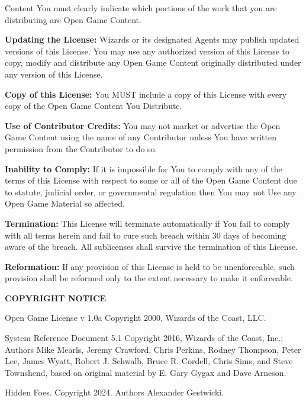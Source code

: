 \documentclass[letterpaper, 12pt, twocolumn]{article}
\def\projecttitle{Hidden Foes}
\begin{document}
\begin{footnotesize}
{Content You must clearly indicate which portions of 
the work that you are distributing are Open Game 
Content.
\item \textbf{Updating the License:} Wizards or its designated 
Agents may publish updated versions of this License. 
You may use any authorized version of this License 
to copy, modify and distribute any Open Game 
Content originally distributed under any version of 
this License.
\item \textbf{Copy of this License:} You MUST include a copy of 
this License with every copy of the Open Game 
Content You Distribute.
\item \textbf{Use of Contributor Credits:} You may not market 
or advertise the Open Game Content using the name 
of any Contributor unless You have written 
permission from the Contributor to do so.
\item \textbf{Inability to Comply:} If it is impossible for You to 
comply with any of the terms of this License with 
respect to some or all of the Open Game Content due 
to statute, judicial order, or governmental regulation 
then You may not Use any Open Game Material so 
affected.
\item \textbf{Termination:} This License will terminate 
automatically if You fail to comply with all terms 
herein and fail to cure such breach within 30 days of 
becoming aware of the breach. All sublicenses shall 
survive the termination of this License.
\item \textbf{Reformation:} If any provision of this License is 
held to be unenforceable, such provision shall be 
reformed only to the extent necessary to make it 
enforceable.
\item \textbf{COPYRIGHT NOTICE}

Open Game License v 1.0a Copyright 2000, Wizards 
of the Coast, LLC.

System Reference Document 5.1 Copyright 2016, 
Wizards of the Coast, Inc.; Authors Mike Mearls, 
Jeremy Crawford, Chris Perkins, Rodney Thompson, 
Peter Lee, James Wyatt, Robert J. Schwalb, Bruce R. 
Cordell, Chris Sims, and Steve Townshend, based on 
original material by E. Gary Gygax and Dave Arneson.

\projecttitle. Copyright 2024. Authors Alexander Gestwicki.}
\end{footnotesize}
\end{document}
